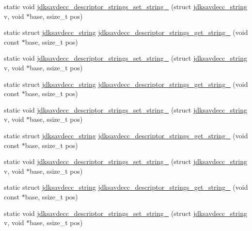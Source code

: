 \begin{DoxyCompactItemize}
\item 
static void \hyperlink{group__descriptor__strings_ga15417881f32d11bb72284538e642b800}{jdksavdecc\+\_\+descriptor\+\_\+strings\+\_\+set\+\_\+string\+\_} (struct \hyperlink{structjdksavdecc__string}{jdksavdecc\+\_\+string} v, void $\ast$base, ssize\+\_\+t pos)
\item 
static struct \hyperlink{structjdksavdecc__string}{jdksavdecc\+\_\+string} \hyperlink{group__descriptor__strings_ga3a8b9207c916e4b017ac8d0055943f99}{jdksavdecc\+\_\+descriptor\+\_\+strings\+\_\+get\+\_\+string\+\_} (void const $\ast$base, ssize\+\_\+t pos)
\item 
static void \hyperlink{group__descriptor__strings_gab584eb48dcb1364652f3e352a6e9e2b6}{jdksavdecc\+\_\+descriptor\+\_\+strings\+\_\+set\+\_\+string\+\_} (struct \hyperlink{structjdksavdecc__string}{jdksavdecc\+\_\+string} v, void $\ast$base, ssize\+\_\+t pos)
\item 
static struct \hyperlink{structjdksavdecc__string}{jdksavdecc\+\_\+string} \hyperlink{group__descriptor__strings_ga6a566c18e4a6ac8dc732e548aa99a5a4}{jdksavdecc\+\_\+descriptor\+\_\+strings\+\_\+get\+\_\+string\+\_} (void const $\ast$base, ssize\+\_\+t pos)
\item 
static void \hyperlink{group__descriptor__strings_gaa41941929c1f067fbfd329907a467bb0}{jdksavdecc\+\_\+descriptor\+\_\+strings\+\_\+set\+\_\+string\+\_} (struct \hyperlink{structjdksavdecc__string}{jdksavdecc\+\_\+string} v, void $\ast$base, ssize\+\_\+t pos)
\item 
static struct \hyperlink{structjdksavdecc__string}{jdksavdecc\+\_\+string} \hyperlink{group__descriptor__strings_ga920701c73b5fc0591c83c533dfd503ab}{jdksavdecc\+\_\+descriptor\+\_\+strings\+\_\+get\+\_\+string\+\_} (void const $\ast$base, ssize\+\_\+t pos)
\item 
static void \hyperlink{group__descriptor__strings_ga070e5daf362847b1d6a662d24c071d52}{jdksavdecc\+\_\+descriptor\+\_\+strings\+\_\+set\+\_\+string\+\_} (struct \hyperlink{structjdksavdecc__string}{jdksavdecc\+\_\+string} v, void $\ast$base, ssize\+\_\+t pos)
\item 
static struct \hyperlink{structjdksavdecc__string}{jdksavdecc\+\_\+string} \hyperlink{group__descriptor__strings_ga3fe6b3d1db63f7b86722dcc7860ec81b}{jdksavdecc\+\_\+descriptor\+\_\+strings\+\_\+get\+\_\+string\+\_} (void const $\ast$base, ssize\+\_\+t pos)
\item 
static void \hyperlink{group__descriptor__strings_gac778e6d58f23f864f9d0b00bdc25e4f9}{jdksavdecc\+\_\+descriptor\+\_\+strings\+\_\+set\+\_\+string\+\_} (struct \hyperlink{structjdksavdecc__string}{jdksavdecc\+\_\+string} v, void $\ast$base, ssize\+\_\+t pos)

\end{DoxyCompactItemize}
